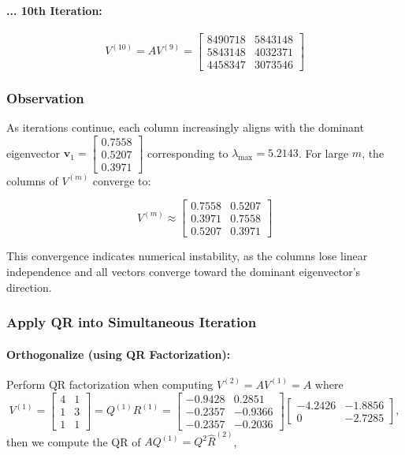 \documentclass[12pt]{article}
\begin{document}
\paragraph{... 10th Iteration:}

$$
V^{(10)} = A V^{(9)} = \begin{bmatrix} 8490718 & 5843148 \\ 5843148 & 4032371 \\ 4458347 & 3073546 \end{bmatrix}
$$

\subsubsection*{Observation}

As iterations continue, each column increasingly aligns with the dominant eigenvector $\mathbf{v}_1 = \begin{bmatrix} 0.7558 \\ 0.5207 \\ 0.3971 \end{bmatrix}$ corresponding to $\lambda_{\max} = 5.2143$. For large $ m $, the columns of $ V^{(m)} $ converge to:

$$
V^{(m)} \approx \begin{bmatrix} 0.7558 & 0.5207 \\ 0.3971 & 0.7558 \\ 0.5207 & 0.3971 \end{bmatrix}
$$

This convergence indicates numerical instability, as the columns lose linear independence and all vectors converge toward the dominant eigenvector's direction.

\subsubsection*{Apply QR into Simultaneous Iteration}

\paragraph{Orthogonalize (using QR Factorization):}

Perform QR factorization when computing $V^{(2)}= AV^{(1)} = A$ where
$$
V^{(1)} = \begin{bmatrix} 4 & 1 \\ 1 & 3 \\ 1 & 1 \end{bmatrix} =Q^{(1)}R^{(1)}=  \begin{bmatrix}
-0.9428 & 0.2851 \\
-0.2357 & -0.9366 \\
-0.2357 & -0.2036
\end{bmatrix} \begin{bmatrix}
-4.2426 & -1.8856 \\
0 & -2.7285
\end{bmatrix},
$$
then we compute the QR of $AQ^{(1)} = Q^{2} \hat{R}^{(2)}$,
\end{document}
